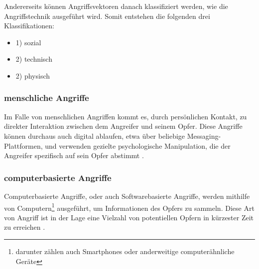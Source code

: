 Andererseits können Angriffsvektoren danach klassifiziert werden, wie die Angriffstechnik ausgeführt wird.
Somit entstehen die folgenden drei Klassifikationen:

\begin{minipage}{.5\linewidth}
    \begin{itemize}
        \setlength\itemsep{1em}
        \item 1) sozial
        \item 2) technisch
        \item 2) physisch
    \end{itemize}
\end{minipage}
\hfill
\begin{minipage}{.5\linewidth}
    \centering
\end{minipage}

\subsubsection{menschliche Angriffe}

Im Falle von menschlichen Angriffen kommt es, durch persönlichen Kontakt, zu direkter Interaktion zwischen dem Angreifer und seinem Opfer.
Diese Angriffe können durchaus auch digital ablaufen, etwa über beliebige Messaging-Plattformen, und verwenden gezielte psychologische Manipulation,
die der Angreifer spezifisch auf sein Opfer abstimmt .

\subsubsection{computerbasierte Angriffe}

Computerbasierte Angriffe, oder auch Softwarebasierte Angriffe, werden mithilfe von Computern\footnote{darunter zählen auch Smartphones oder anderweitige computerähnliche Geräte}
ausgeführt, um Informationen des Opfers zu sammeln. Diese Art von Angriff ist in der Lage eine Vielzahl
von potentiellen Opfern in kürzester Zeit zu erreichen .

